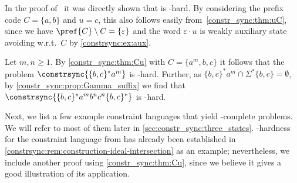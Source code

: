 \begin{example}
In the proof of~
it was directly shown 
that  is \PSPACE-hard.
By considering the prefix code $C = \{a,b\}$ and $u = c$,
this also follows easily 
from~\cref{constr_sync:thm:uC}, since
we have $\pref{C} \setminus C = \{\varepsilon\}$
and the word $\varepsilon\cdot u$
is weakly auxiliary state avoiding
w.r.t.~$C$ by \cref{constrsync:ex:aux}.
\end{example}

\begin{example}
	\label{constrsync:pspace-hard-example}
	Let $m,n \ge 1$.
	By \cref{constr_sync:thm:Cu} with $C = \{a^m,b,c\}$
	it follows that the problem $\constrsync{\{b,c\}^*a^m}$
	is \PSPACE-hard.
	Further, as $\{b,c\}^*a^m \cap \Sigma^*\{b,c\} = \emptyset$,
	by \cref{constr_sync:prop:Gamma_suffix} 
	we find that 
	$
	\constrsync{\{b,c\}^*a^m b^n c^n \{b,c\}^*}
	$
	is \PSPACE-hard.	
\end{example}

Next, we list a few example constraint languages that yield \PSPACE-complete problems. 
We will refer to most of them later in \cref{sec:constr_sync:three_states}.
\PSPACE-hardness for the constraint language from  has already been established in \cref{constrsync:rem:construction-ideal-intersection} as an example; nevertheless, we include another proof using \cref{constr_sync:thm:Cu}, since we believe it gives a good illustration of its application.

